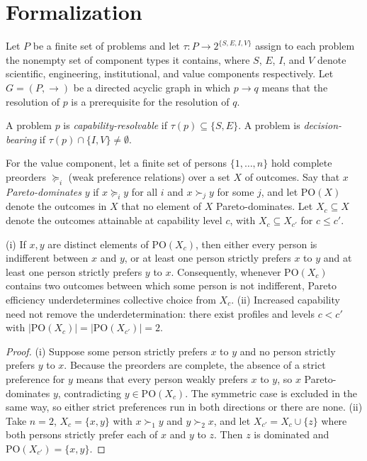 \section*{Formalization}

Let $P$ be a finite set of problems and let $\tau:P\to 2^{\{S,E,I,V\}}$ assign to each problem the nonempty set of component types it contains, where $S$, $E$, $I$, and $V$ denote scientific, engineering, institutional, and value components respectively. Let $G=(P,\to)$ be a directed acyclic graph in which $p\to q$ means that the resolution of $p$ is a prerequisite for the resolution of $q$.

\begin{definition}
A problem $p$ is \emph{capability-resolvable} if $\tau(p)\subseteq\{S,E\}$. A problem is \emph{decision-bearing} if $\tau(p)\cap\{I,V\}\neq\emptyset$.
\end{definition}

For the value component, let a finite set of persons $\{1,\dots,n\}$ hold complete preorders $\succeq_i$ (weak preference relations) over a set $X$ of outcomes. Say that $x$ \emph{Pareto-dominates} $y$ if $x\succeq_iy$ for all $i$ and $x\succ_jy$ for some $j$, and let $\mathrm{PO}(X)$ denote the outcomes in $X$ that no element of $X$ Pareto-dominates. Let $X_c\subseteq X$ denote the outcomes attainable at capability level $c$, with $X_c\subseteq X_{c'}$ for $c\le c'$.

\begin{proposition}
(i) If $x,y$ are distinct elements of $\mathrm{PO}(X_c)$, then either every person is indifferent between $x$ and $y$, or at least one person strictly prefers $x$ to $y$ and at least one person strictly prefers $y$ to $x$. Consequently, whenever $\mathrm{PO}(X_c)$ contains two outcomes between which some person is not indifferent, Pareto efficiency underdetermines collective choice from $X_c$. (ii) Increased capability need not remove the underdetermination: there exist profiles and levels $c<c'$ with $|\mathrm{PO}(X_c)|=|\mathrm{PO}(X_{c'})|=2$.
\end{proposition}

\begin{proof}
(i) Suppose some person strictly prefers $x$ to $y$ and no person strictly prefers $y$ to $x$. Because the preorders are complete, the absence of a strict preference for $y$ means that every person weakly prefers $x$ to $y$, so $x$ Pareto-dominates $y$, contradicting $y\in\mathrm{PO}(X_c)$. The symmetric case is excluded in the same way, so either strict preferences run in both directions or there are none. (ii) Take $n=2$, $X_c=\{x,y\}$ with $x\succ_1y$ and $y\succ_2x$, and let $X_{c'}=X_c\cup\{z\}$ where both persons strictly prefer each of $x$ and $y$ to $z$. Then $z$ is dominated and $\mathrm{PO}(X_{c'})=\{x,y\}$.
\end{proof}

